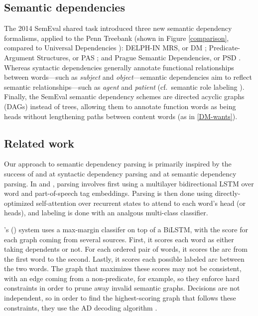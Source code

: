 \documentclass[11pt,a4paper]{article}
\newcommand{\citea}[1]{\citeauthor{#1}'s (\citeyear{#1})}
\begin{document}
\subsection{Semantic dependencies}
The 2014 SemEval \citep{Oepenetal2014,Oepenetal2015} shared task introduced three new semantic dependency formalisms, applied to the Penn Treebank (shown in Figure \ref{comparison}, compared to Universal Dependencies \citep{Nivreetal2016}): DELPH-IN MRS, or DM \citep{Flickingeretal2012,OepenLoenning2006}; Predicate-Argument Structures, or PAS \citep{MiyaoTsujii2004}; and Prague Semantic Dependencies, or PSD \citep{Hajicetal2012}.
Whereas syntactic dependencies generally annotate functional relationships between words---such as \emph{subject} and \emph{object}---semantic dependencies aim to reflect semantic relationships---such as \emph{agent} and \emph{patient} (cf.\ semantic role labeling \citep{GildeaJurafsky2002}).
Finally, the SemEval semantic dependency schemes are directed acyclic graphs (DAGs) instead of trees, allowing them to annotate function words as being heads without lengthening paths between content words (as in \ref{DM-wants}).

\subsection{Related work}
Our approach to semantic dependency parsing is primarily inspired by the success of \citet{DozatManning2017} and \citet{DozatQiManning2017} at syntactic dependency parsing and \citet{PengThomsonSmith2017} at semantic dependency parsing. In \citet{DozatManning2017} and \citet{PengThomsonSmith2017}, parsing involves first using a multilayer bidirectional LSTM over word and part-of-speech tag embeddings. Parsing is then done using directly-optimized self-attention over recurrent states to attend to each word's head (or heads), and labeling is done with an analgous multi-class classifier.

\citea{PengThomsonSmith2017} system uses a max-margin classifer on top of a BiLSTM, with the score for each graph coming from several sources. First, it scores each word as either taking dependents or not. For each ordered pair of words, it scores the arc from the first word to the second. Lastly, it scores each possible labeled arc between the two words. The graph that maximizes these scores may not be consistent, with an edge coming from a non-predicate, for example, so they enforce hard constraints in order to prune away invalid semantic graphs. Decisions are not independent, so in order to find the highest-scoring graph that follows these constraints, they use the AD decoding algorithm \citep{Martinsetal2011}.
\end{document}

